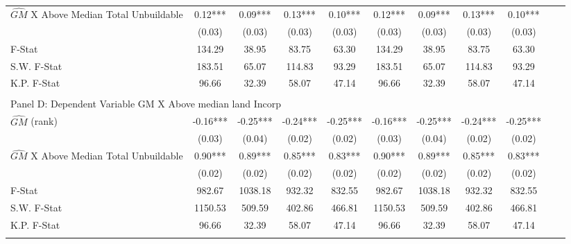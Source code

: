 \begin{table}[htbp]
\begin{threeparttable}
\begin{tabular}{l*{10}{c}}
\addlinespace
$\hat{GM}$ X Above Median Total Unbuildable&       0.12***&       0.09***&       0.13***&       0.10***&       0.12***&       0.09***&       0.13***&       0.10***\\
                &     (0.03)   &     (0.03)   &     (0.03)   &     (0.03)   &     (0.03)   &     (0.03)   &     (0.03)   &     (0.03)   \\
\midrule
F-Stat          &     134.29   &      38.95   &      83.75   &      63.30   &     134.29   &      38.95   &      83.75   &      63.30   \\
S.W. F-Stat     &     183.51   &      65.07   &     114.83   &      93.29   &     183.51   &      65.07   &     114.83   &      93.29   \\
K.P. F-Stat     &      96.66   &      32.39   &      58.07   &      47.14   &      96.66   &      32.39   &      58.07   &      47.14   \\
\cmidrule[\heavyrulewidth](lr){1-9} \\ \cmidrule[\heavyrulewidth](lr){1-9}
\multicolumn{8}{l}{Panel D: Dependent Variable GM X Above median land Incorp}\\
\cmidrule(lr){1-9}
$\hat{GM}$ (rank)&      -0.16***&      -0.25***&      -0.24***&      -0.25***&      -0.16***&      -0.25***&      -0.24***&      -0.25***\\
                &     (0.03)   &     (0.04)   &     (0.02)   &     (0.02)   &     (0.03)   &     (0.04)   &     (0.02)   &     (0.02)   \\
\addlinespace
$\hat{GM}$ X Above Median Total Unbuildable&       0.90***&       0.89***&       0.85***&       0.83***&       0.90***&       0.89***&       0.85***&       0.83***\\
                &     (0.02)   &     (0.02)   &     (0.02)   &     (0.02)   &     (0.02)   &     (0.02)   &     (0.02)   &     (0.02)   \\
\midrule
F-Stat          &     982.67   &    1038.18   &     932.32   &     832.55   &     982.67   &    1038.18   &     932.32   &     832.55   \\
S.W. F-Stat     &    1150.53   &     509.59   &     402.86   &     466.81   &    1150.53   &     509.59   &     402.86   &     466.81   \\
K.P. F-Stat     &      96.66   &      32.39   &      58.07   &      47.14   &      96.66   &      32.39   &      58.07   &      47.14   \\
\cmidrule[\heavyrulewidth](lr){1-9} \\ \cmidrule[\heavyrulewidth](lr){1-9}

\end{tabular}
\end{threeparttable}
\end{table}

